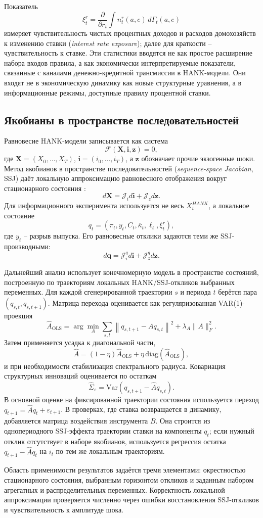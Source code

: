 Показатель
\[
\xi_t^r
=
\frac{\partial}{\partial r_t}
\int n_t^r(a,e)\,d\Gamma_t(a,e)
\]
измеряет чувствительность чистых процентных доходов и расходов домохозяйств к изменению ставки
(\textit{interest rate exposure}); далее для краткости -- чувствительность к ставке. Эти
статистики вводятся не как простое расширение набора входов правила, а как экономически
интерпретируемые показатели, связанные с каналами денежно-кредитной трансмиссии в HANK-модели.
Они входят не в экономическую динамику как новые структурные уравнения, а в информационные
режимы, доступные правилу процентной ставки.

\subsection{Якобианы в пространстве последовательностей}

Равновесие HANK-модели записывается как система
\[
\mathcal F(\mathbf X,\mathbf i,\mathbf z)=0,
\]
где \(\mathbf X=(X_0,\ldots,X_T)\), \(\mathbf i=(i_0,\ldots,i_T)\), а \(\mathbf z\) обозначает
прочие экзогенные шоки. Метод якобианов в пространстве последовательностей
(\textit{sequence-space Jacobian}, SSJ) даёт локальную аппроксимацию равновесного отображения
вокруг стационарного состояния \cite{auclert2021sequence}:
\[
d\mathbf X
=
\mathcal J_i d\mathbf i+\mathcal J_z d\mathbf z .
\]
Для информационного эксперимента используется не весь \(X_t^{HANK}\), а локальное состояние
\[
q_t
=
\left(
\pi_t,y_t,C_t,\overline{\kappa}_t,\ell_t,\xi_t^r
\right),
\]
где \(y_t\) -- разрыв выпуска. Его равновесные отклики задаются теми же SSJ-производными:
\[
d\mathbf q
=
\mathcal J_i^q d\mathbf i+\mathcal J_z^q d\mathbf z .
\]

Дальнейший анализ использует конечномерную модель в пространстве состояний, построенную по
траекториям локальных HANK/SSJ-откликов выбранных переменных. Для каждой сгенерированной
траектории \(s\) и периода \(t\) берётся пара \((q_{s,t},q_{s,t+1})\). Матрица перехода
оценивается как регуляризованная VAR(1)-проекция
\[
\widehat A_{\mathrm{OLS}}
=
\arg\min_A
\sum_{s,t}
\left\|
q_{s,t+1}-Aq_{s,t}
\right\|^2
+\lambda_A\|A\|_F^2 .
\]
Затем применяется усадка к диагональной части,
\[
\widehat A
=
(1-\eta)\widehat A_{\mathrm{OLS}}
+\eta\,\mathrm{diag}(\widehat A_{\mathrm{OLS}}),
\]
и при необходимости стабилизация спектрального радиуса. Ковариация структурных инноваций
оценивается по остаткам
\[
\widehat\Sigma_\varepsilon
=
\mathrm{Var}\!\left(q_{s,t+1}-\widehat A q_{s,t}\right).
\]
В основной оценке на фиксированной траектории состояния используется переход
\(q_{t+1}=\widehat A q_t+\varepsilon_{t+1}\). В проверках, где ставка возвращается в динамику,
добавляется матрица воздействия инструмента \(B\). Она строится из однопериодного SSJ-эффекта
траектории ставки на компоненты \(q_t\); если нужный отклик отсутствует в наборе якобианов,
используется регрессия остатка \(q_{t+1}-\widehat A q_t\) на \(i_t\) по тем же локальным
траекториям.

Область применимости результатов задаётся тремя элементами: окрестностью стационарного состояния,
выбранным горизонтом откликов и заданным набором агрегатных и распределительных переменных.
Корректность локальной аппроксимации проверяется численно через ошибки восстановления
SSJ-откликов и чувствительность к амплитуде шока.
